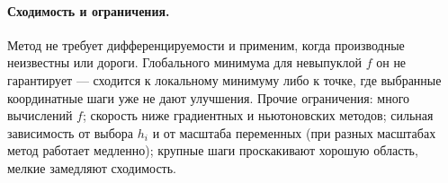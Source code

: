 \paragraph{Сходимость и ограничения.}
Метод не требует дифференцируемости и применим, когда производные неизвестны
или дороги. Глобального минимума для невыпуклой $f$ он не гарантирует —
сходится к локальному минимуму либо к точке, где выбранные координатные шаги
уже не дают улучшения. Прочие ограничения: много вычислений $f$; скорость ниже
градиентных и ньютоновских методов; сильная зависимость от выбора $h_i$ и от
масштаба переменных (при разных масштабах метод работает медленно); крупные
шаги проскакивают хорошую область, мелкие замедляют сходимость.

